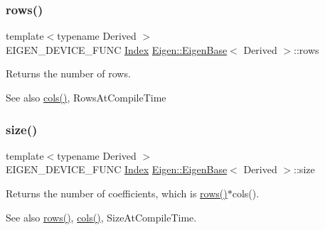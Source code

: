 \subsubsection{\texorpdfstring{rows()}{rows()}}
{\footnotesize\ttfamily template$<$typename Derived $>$ \\
E\+I\+G\+E\+N\+\_\+\+D\+E\+V\+I\+C\+E\+\_\+\+F\+U\+NC \mbox{\hyperlink{struct_eigen_1_1_eigen_base_a554f30542cc2316add4b1ea0a492ff02}{Index}} \mbox{\hyperlink{struct_eigen_1_1_eigen_base}{Eigen\+::\+Eigen\+Base}}$<$ Derived $>$\+::rows\hspace{0.3cm}{\ttfamily [inline]}}

\begin{DoxyReturn}{Returns}
the number of rows. 
\end{DoxyReturn}
\begin{DoxySeeAlso}{See also}
\mbox{\hyperlink{struct_eigen_1_1_eigen_base_a7b0b45c7351847696c911ce8aa2abbdb}{cols()}}, Rows\+At\+Compile\+Time 
\end{DoxySeeAlso}
\mbox{\label{class_eigen_1_1_dense_coeffs_base_3_01_derived_00_01_read_only_accessors_01_4_ac2c9348df3bb9c0044dbae6c278a8977}} 
\subsubsection{\texorpdfstring{size()}{size()}}
{\footnotesize\ttfamily template$<$typename Derived $>$ \\
E\+I\+G\+E\+N\+\_\+\+D\+E\+V\+I\+C\+E\+\_\+\+F\+U\+NC \mbox{\hyperlink{struct_eigen_1_1_eigen_base_a554f30542cc2316add4b1ea0a492ff02}{Index}} \mbox{\hyperlink{struct_eigen_1_1_eigen_base}{Eigen\+::\+Eigen\+Base}}$<$ Derived $>$\+::size\hspace{0.3cm}{\ttfamily [inline]}}

\begin{DoxyReturn}{Returns}
the number of coefficients, which is \mbox{\hyperlink{struct_eigen_1_1_eigen_base_a8141320ba8df384426c298b32b000d8e}{rows()}}$\ast$cols(). 
\end{DoxyReturn}
\begin{DoxySeeAlso}{See also}
\mbox{\hyperlink{struct_eigen_1_1_eigen_base_a8141320ba8df384426c298b32b000d8e}{rows()}}, \mbox{\hyperlink{struct_eigen_1_1_eigen_base_a7b0b45c7351847696c911ce8aa2abbdb}{cols()}}, Size\+At\+Compile\+Time. 
\end{DoxySeeAlso}
\mbox{\label{class_eigen_1_1_dense_coeffs_base_3_01_derived_00_01_read_only_accessors_01_4_a422892fbb6b2eecce243776c3b8452ab}} 
